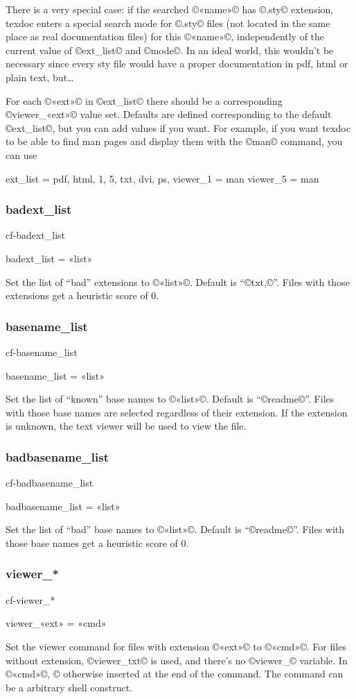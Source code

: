 \documentclass[a4paper, oneside]{scrartcl}
\makeatletter
\newif\ifframed
\newenvironment{cmdsubsub}[2]{%
  \framedfalse \commandes\subsubsection{#1}{#2}%
  }{%
  \endcommandes}
\newenvironment{htcode}{%
  \SaveVerbatim[samepage, gobble=2]{verbmat}%
  }{%
  \endSaveVerbatim
  \par\medskip\noindent\hspace*{\parindent}%
  \BUseVerbatim{verbmat}%
  \par\medskip\@endpetrue}
\makeatother
\begin{document}
There is a very special case: if the searched ©«name»© has ©.sty© extension,
texdoc enters a special search mode for ©.sty© files (not located in the same
place as real documentation files) for this ©«name»©, independently of the
current value of ©ext_list© and ©mode©. In an ideal world, this wouldn't be
necessary since every sty file would have a proper documentation in pdf, html
or plain text, but\dots

For each ©«ext»© in ©ext_list© there should be a corresponding ©viewer_«ext»©
value set.  Defaults are defined corresponding to the default ©ext_list©, but
you can add values if you want.  For example, if you want texdoc to be able
to find man pages and display them with the ©man© command, you can use
\begin{htcode}
  ext_list = pdf, html, 1, 5, txt, dvi, ps,
  viewer_1 = man
  viewer_5 = man
\end{htcode}

\begin{cmdsubsub}{badext_list}{cf-badext_list}
  badext_list = «list»
\end{cmdsubsub}

Set the list of ``bad'' extensions to ©«list»©.  Default is ``©txt,©''. Files
with those extensions get a heuristic score of 0.

\begin{cmdsubsub}{basename_list}{cf-basename_list}
  basename_list = «list»
\end{cmdsubsub}

Set the list of ``known'' base names to ©«list»©.  Default is ``©readme©''.
Files with those base names are selected regardless of their extension. If the
extension is unknown, the text viewer will be used to view the file.

\begin{cmdsubsub}{badbasename_list}{cf-badbasename_list}
  badbasename_list = «list»
\end{cmdsubsub}

Set the list of ``bad'' base names to ©«list»©.  Default is ``©readme©''. Files
with those base names get a heuristic score of 0.

\begin{cmdsubsub}{viewer_*}{cf-viewer_*}
  viewer_«ext» = «cmd»
\end{cmdsubsub}

Set the viewer command for files with extension ©«ext»© to ©«cmd»©. For files
without extension, ©viewer_txt© is used, and there's no ©viewer_© variable.
In ©«cmd»©, ©%
otherwise inserted at the end of the command.  The command can be a arbitrary
shell construct.
\end{document}
